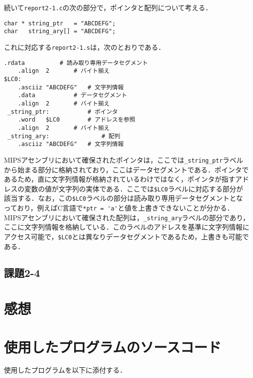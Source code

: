 続いて\verb|report2-1.c|の次の部分で，ポインタと配列について考える．
\begin{Verbatim}[fontsize=\small, baselinestretch=0.8]
char * string_ptr   = "ABCDEFG";
char   string_ary[] = "ABCDEFG";
\end{Verbatim}

\noindent これに対応する\verb|report2-1.s|は，次のとおりである．
\begin{Verbatim}[fontsize=\small, baselinestretch=0.8]
	.rdata			# 読み取り専用データセグメント
	.align	2		# バイト揃え
$LC0:
 	.asciiz	"ABCDEFG"	# 文字列情報
 	.data			# データセグメント
 	.align	2		# バイト揃え
 _string_ptr:			# ポインタ
 	.word	$LC0		# アドレスを参照
 	.align	2		# バイト揃え
 _string_ary:				# 配列
 	.asciiz	"ABCDEFG"	# 文字列情報
\end{Verbatim}

MIPSアセンブリにおいて確保されたポインタは，ここでは\verb|_string_ptr|ラベルから始まる部分に格納されており，ここはデータセグメントである．ポインタであるため，直に文字列情報が格納されているわけではなく，ポインタが指すアドレスの変数の値が文字列の実体である．ここでは\verb|$LC0|ラベルに対応する部分が該当する．なお，この\verb|$LC0|ラベルの部分は読み取り専用データセグメントとなっており，例えばC言語で\verb|*ptr = 'a'|と値を上書きできないことが分かる．MIPSアセンブリにおいて確保された配列は，\verb|_string_ary|ラベルの部分であり，ここに文字列情報を格納している．このラベルのアドレスを基準に文字列情報にアクセス可能で，\verb|$LC0|とは異なりデータセグメントであるため，上書きも可能である．


\subsection{課題2-4}


\section{感想}


\section{使用したプログラムのソースコード} \label{sec:makep}

使用したプログラムを以下に添付する．

